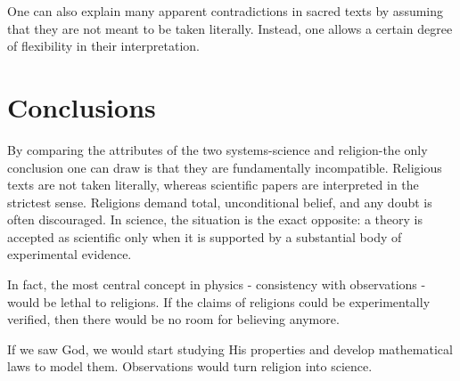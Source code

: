 One can also explain many apparent contradictions in sacred
texts by assuming that they are not meant to be taken literally.
Instead, one allows a certain degree of flexibility in their
interpretation.



\section{Conclusions}

By comparing the attributes of the two systems-science and religion-the only conclusion one can draw is that they are fundamentally incompatible.
Religious texts are not taken literally, whereas scientific papers are interpreted in the strictest sense.
Religions demand total, unconditional belief, and any doubt is often discouraged.
In science, the situation is the exact opposite: a theory is accepted as scientific only when it is supported by a substantial body of experimental evidence.

In fact, the most central concept in physics - consistency with observations - would be lethal to religions. 
If the claims of religions could be experimentally verified, then there would be no room for believing anymore.

If we saw God, we would start studying His properties and develop mathematical laws to model them.
Observations would turn religion into science.

